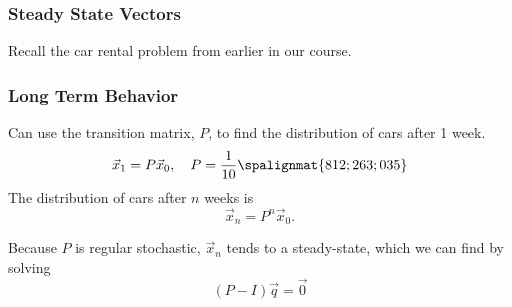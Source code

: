 \begin{frame}
\frametitle{Steady State Vectors}

    Recall the car rental problem from earlier in our course.
    
    \begin{center}\end{center}
    
    
\end{frame}

\begin{frame}\frametitle{Long Term Behavior}

    Can use the transition matrix, $P$, to find the distribution of cars after 1 week.
    $$
    \vec x_1 = P\vec x_0 , \quad P = \frac{1}{10}\spalignmat{8 1 2;2 6 3;0 3 5}
    $$
    The distribution of cars after $n$ weeks is $$\vec x_n = P^n \vec x_0.$$
    
    \pause 
    Because $P$ is regular stochastic, $\vec x_n$ tends to a steady-state, which we can find by solving
    $$(P-I)\vec q = \vec 0$$
    

    
\end{frame}


